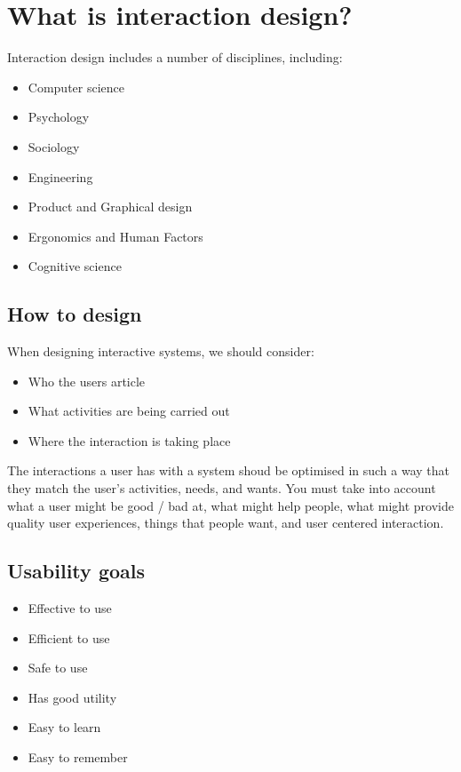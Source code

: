 \section{What is interaction design?}

Interaction design includes a number of disciplines, including:
\begin{itemize}
    \item Computer science
    \item Psychology
    \item Sociology
    \item Engineering
    \item Product and Graphical design
    \item Ergonomics and Human Factors
    \item Cognitive science
\end{itemize}

\subsection{How to design}
When designing interactive systems, we should consider:
\begin{itemize}
    \item Who the users article
    \item What activities are being carried out
    \item Where the interaction is taking place
\end{itemize}

The interactions a user has with a system shoud be optimised in such a way that they match the user's activities, needs, and wants.
You must take into account what a user might be good / bad at, what might help people, what might provide
quality user experiences, things that people want, and user centered interaction.

\subsection{Usability goals}
\begin{itemize}
    \item Effective to use
    \item Efficient to use
    \item Safe to use 
    \item Has good utility 
    \item Easy to learn 
    \item Easy to remember
\end{itemize}

